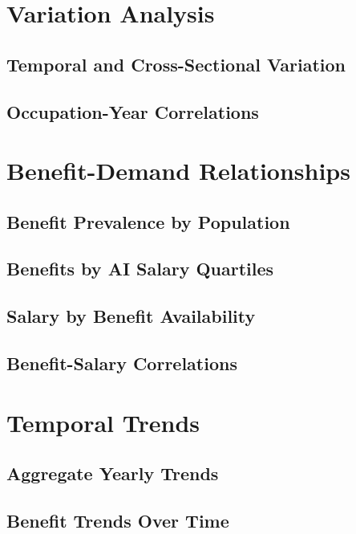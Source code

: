 \documentclass{article}
\begin{document}
\section{Variation Analysis}
\subsection{Temporal and Cross-Sectional Variation}


\subsection{Occupation-Year Correlations}


\section{Benefit-Demand Relationships}
\subsection{Benefit Prevalence by Population}


\subsection{Benefits by AI Salary Quartiles}


\subsection{Salary by Benefit Availability}


\subsection{Benefit-Salary Correlations}


\section{Temporal Trends}
\subsection{Aggregate Yearly Trends}


\subsection{Benefit Trends Over Time}

\end{document}
